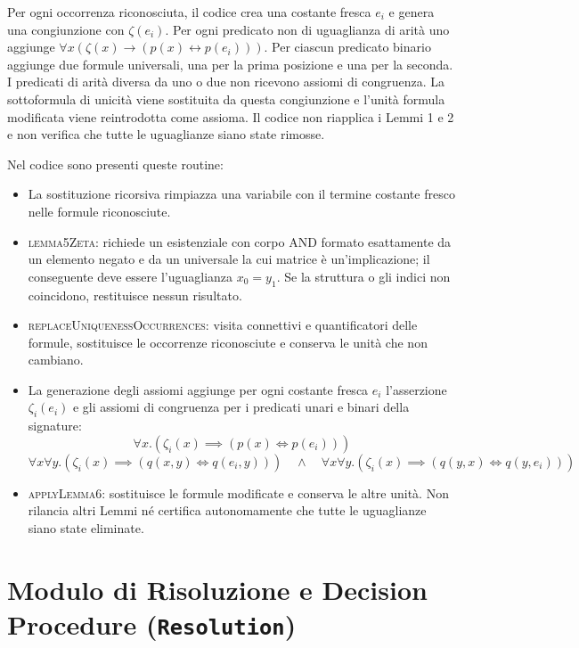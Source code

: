 Per ogni occorrenza riconosciuta, il codice crea una costante fresca $e_i$ e genera una congiunzione con $\zeta(e_i)$. Per ogni predicato non di uguaglianza di arità uno aggiunge $\forall x(\zeta(x)\to(p(x)\leftrightarrow p(e_i)))$. Per ciascun predicato binario aggiunge due formule universali, una per la prima posizione e una per la seconda. I predicati di arità diversa da uno o due non ricevono assiomi di congruenza. La sottoformula di unicità viene sostituita da questa congiunzione e l'unità formula modificata viene reintrodotta come assioma. Il codice non riapplica i Lemmi 1 e 2 e non verifica che tutte le uguaglianze siano state rimosse.

Nel codice sono presenti queste routine:
\begin{itemize}
    \item La sostituzione ricorsiva rimpiazza una variabile con il termine costante fresco nelle formule riconosciute.
    
    \item \textsc{lemma5Zeta}: richiede un esistenziale con corpo AND formato esattamente da un elemento negato e da un universale la cui matrice è un'implicazione; il conseguente deve essere l'uguaglianza $x_0=y_1$. Se la struttura o gli indici non coincidono, restituisce nessun risultato.
    
    \item \textsc{replaceUniquenessOccurrences}: visita connettivi e quantificatori delle formule, sostituisce le occorrenze riconosciute e conserva le unità che non cambiano.
    
    \item La generazione degli assiomi aggiunge per ogni costante fresca $e_i$ l'asserzione $\zeta_i(e_i)$ e gli assiomi di congruenza per i predicati unari e binari della signature:
    $$\forall x . (\zeta_i(x) \implies (p(x) \iff p(e_i)))$$
    $$\forall x \forall y . (\zeta_i(x) \implies (q(x, y) \iff q(e_i, y))) \quad\land\quad \forall x \forall y . (\zeta_i(x) \implies (q(y, x) \iff q(y, e_i)))$$
    
    \item \textsc{applyLemma6}: sostituisce le formule modificate e conserva le altre unità. Non rilancia altri Lemmi né certifica autonomamente che tutte le uguaglianze siano state eliminate.
\end{itemize}




\section{Modulo di Risoluzione e Decision Procedure (\texttt{Resolution})}
\label{sec:fo2resolution_module}

